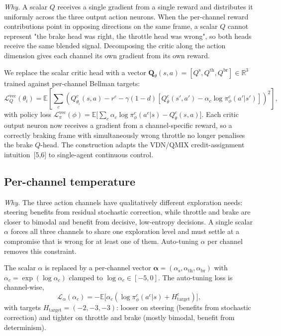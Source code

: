 \documentclass{article}
\begin{document}
\emph{Why.} A scalar $Q$ receives a single gradient from a single
reward and distributes it uniformly across the three output action
neurons. When the per-channel reward contributions point in opposing
directions on the same frame, a scalar $Q$ cannot represent "the
brake head was right, the throttle head was wrong", so both heads
receive the same blended signal. Decomposing the critic along the
action dimension gives each channel its own gradient from its own
reward.

We replace the scalar critic head with a vector
$\mathbf{Q}_\theta(s,a) = [Q^\mathrm{s}, Q^\mathrm{th}, Q^\mathrm{br}] \in \mathbb{R}^3$
trained against per-channel Bellman targets:
\begin{equation}
\mathcal{L}_Q^{\mathrm{vec}}(\theta_i) = \mathbb{E}
\!\left[\sum_{c}
  \left(Q^c_{\theta_i}(s,a) - r^c - \gamma(1{-}d)\!\left[Q^c_{\bar\theta}(s', a') - \alpha_c \log \pi^c_\phi(a'|s')\right]\right)^2\right],
\label{eq:vec-q}
\end{equation}
with policy loss
$\mathcal{L}_\pi^{\mathrm{vec}}(\phi) = \mathbb{E}\bigl[\sum_c \alpha_c \log \pi^c_\phi(a^c|s) - Q^c_\theta(s, a)\bigr]$.
Each critic output neuron now receives a gradient from a
channel-specific reward, so a correctly braking frame with
simultaneously wrong throttle no longer penalises the brake $Q$-head.
The construction adapts the VDN/QMIX credit-assignment intuition~[5,6]
to single-agent continuous control.

\subsection{Per-channel temperature}
\label{sec:per-channel-alpha}

\emph{Why.} The three action channels have qualitatively different
exploration needs: steering benefits from residual stochastic
correction, while throttle and brake are closer to bimodal and
benefit from decisive, low-entropy decisions. A single scalar
$\alpha$ forces all three channels to share one exploration level
and must settle at a compromise that is wrong for at least one of
them. Auto-tuning $\alpha$ per channel removes this constraint.

The scalar $\alpha$ is replaced by a per-channel vector
$\boldsymbol{\alpha} = (\alpha_\mathrm{s}, \alpha_\mathrm{th}, \alpha_\mathrm{br})$
with $\alpha_c = \exp(\log\alpha_c)$ clamped to
$\log\alpha_c \in [-5, 0]$. The auto-tuning loss is channel-wise,
\begin{equation}
\mathcal{L}_\alpha(\alpha_c) = -\mathbb{E}\bigl[\alpha_c(\log\pi^c_\phi(a^c|s) + H^c_\text{target})\bigr],
\label{eq:per-channel-alpha}
\end{equation}
with targets $H_\text{target} = (-2, -3, -3)$: looser on steering
(benefits from stochastic correction) and tighter on throttle and
brake (mostly bimodal, benefit from determinism).
\end{document}
